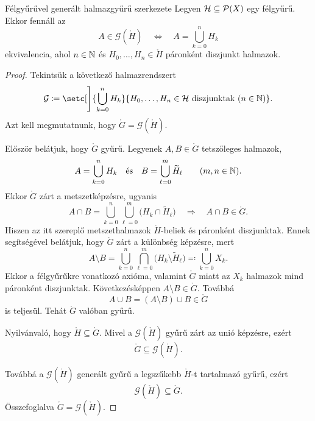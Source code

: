 \documentclass[
]{elteikthesis}[2024/04/26]
\begin{document}
	\begin{lemma}{Félgyűrűvel generált halmazgyűrű szerkezete}{}
		Legyen \( \mathcal{H} \subseteq \mathcal{P}( X ) \) egy félgyűrű. Ekkor fennáll az
		\[
			A \in \mathcal{G}(\ring{H})
			\quad \iff \quad
			A = \bigcup_{k=0}^n H_k
		\]
		ekvivalencia, 
		ahol \( n \in \mathbb{N} \) és \( H_0, \dots, H_n \in \ring{H} \) páronként diszjunkt halmazok.
	\end{lemma}
	\begin{proof}
		Tekintsük a következő halmazrendszert
		\[
			\ring{G} \coloneq 
			\setc[\Bigg]{ \bigcup_{k=0}^n H_k }
			            { H_0, \dots, H_n \in \ring{H} \text{ diszjunktak} \ (n \in \N)}.
		\]
		Azt kell megmutatnunk, hogy \( \ring{G} = \mathcal{G}(\ring{H}) \).
		
		\noindent\hrulefill\vspace{6pt}
		
		Először belátjuk, hogy \( \ring{G} \) gyűrű.
		Legyenek \( A, B \in \ring{G} \) tetszőleges halmazok,
		\[
			A = \bigcup_{k=0}^n H_k 
			\quad \text{és} \quad
			B = \bigcup_{\ell=0}^m \widetilde{H}_\ell
			\qquad (m, n \in \mathbb{N}).
		\]
		Ekkor \( \ring{G} \) zárt a metszetképzésre, ugyanis
		\[
			A \cap B = 
			\bigcup_{k=0}^n \bigcup_{\ell=0}^m \bigl( H_k \cap \widetilde{H}_\ell \bigr)
			\quad \Longrightarrow \quad
			A \cap B \in \ring{G}.
		\]
		Hiszen az itt szereplő metszethalmazok \( \ring{H} \)-beliek és páronként diszjunktak.
		Ennek segítségével belátjuk, hogy \( \ring{G} \) zárt a különbség képzésre, mert
		\[
			A \setminus B = 
			\bigcup_{k=0}^n \bigcap_{\ell=0}^m \bigl( H_k \setminus \widetilde{H}_\ell \bigr)
			\eqcolon \bigcup_{k=0}^n X_k.
		\]
		Ekkor a félgyűrűkre vonatkozó axióma, valamint \( \ring{G} \) miatt az \( X_k \) halmazok mind páronként diszjunktak. Következésképpen \( A \setminus B \in \ring{G} \).
		Továbbá
		\[
			A \cup B = (A \setminus B) \cup B \in \ring{G}
		\]
		is teljesül. Tehát \( \ring{G} \) valóban gyűrű.
		
		\noindent\hrulefill\vspace{6pt}
		
		Nyilvánvaló, hogy \( \ring{H} \subseteq \ring{G} \).
		Mivel a \( \mathcal{G}(\ring{H}) \) gyűrű zárt az unió képzésre, ezért
		\[
			\ring{G} \subseteq \mathcal{G}(\ring{H}).
		\]
		
		Továbbá a \( \mathcal{G}(\ring{H}) \) generált gyűrű a legszűkebb \( \ring{H} \)-t 
		tartalmazó gyűrű, ezért 
		\[
			\mathcal{G}(\ring{H}) \subseteq \ring{G}.
		\]
		Összefoglalva \( \ring{G} = \mathcal{G}(\ring{H}) \).
	\end{proof}
	
\end{document}
